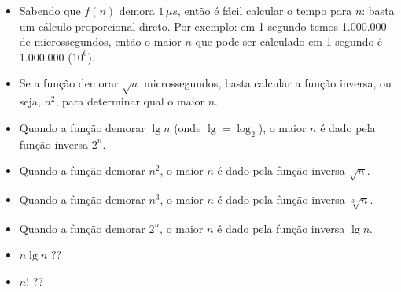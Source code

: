 \documentclass[pdftex,a4paper,12pt,brazil]{article} %
\begin{document}
\begin{itemize}
\item Sabendo que $f(n)$ demora $1\, \mu s$, então é fácil calcular o tempo para $n$:
  basta um cálculo proporcional direto. Por exemplo: em 1 segundo temos 1.000.000 de
  microssegundos, então o maior $n$ que pode ser calculado em 1 segundo é 1.000.000 ($10^6$).
\item Se a função demorar $\sqrt{n}$ microssegundos, basta calcular a função inversa,
  ou seja, $n^2$, para determinar qual o maior $n$.
\item Quando a função demorar $\lg n$ (onde $\lg = \log_2$), o maior $n$ é dado
  pela função inversa $2^n$.
\item Quando a função demorar $n^2$, o maior $n$ é dado pela função inversa $\sqrt{n}$.
\item Quando a função demorar $n^3$, o maior $n$ é dado pela função inversa $\sqrt[3]{n}$.
\item Quando a função demorar $2^n$, o maior $n$ é dado pela função inversa $\lg n$.
\item $n \lg n$ ??
\item $n!$ ??
\end{itemize}


%


\end{document}
